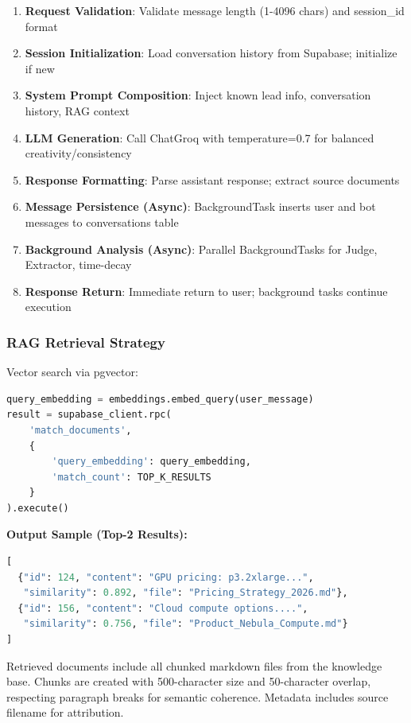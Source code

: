 \documentclass[10pt,twocolumn,a4paper]{article}
\begin{document}
\begin{enumerate}
    \item \textbf{Request Validation}: Validate message length (1-4096 chars) and session\_id format
    \item \textbf{Session Initialization}: Load conversation history from Supabase; initialize if new
    \item \textbf{System Prompt Composition}: Inject known lead info, conversation history, RAG context
    \item \textbf{LLM Generation}: Call ChatGroq with temperature=0.7 for balanced creativity/consistency
    \item \textbf{Response Formatting}: Parse assistant response; extract source documents
    \item \textbf{Message Persistence (Async)}: BackgroundTask inserts user and bot messages to conversations table
    \item \textbf{Background Analysis (Async)}: Parallel BackgroundTasks for Judge, Extractor, time-decay
    \item \textbf{Response Return}: Immediate return to user; background tasks continue execution
\end{enumerate}

\subsubsection{RAG Retrieval Strategy}

Vector search via pgvector:

\begin{lstlisting}[language=Python]
query_embedding = embeddings.embed_query(user_message)
result = supabase_client.rpc(
    'match_documents',
    {
        'query_embedding': query_embedding,
        'match_count': TOP_K_RESULTS
    }
).execute()
\end{lstlisting}

\textbf{Output Sample (Top-2 Results):}
\begin{lstlisting}[language=Python, basicstyle=\ttfamily\tiny]
[
  {"id": 124, "content": "GPU pricing: p3.2xlarge...", 
   "similarity": 0.892, "file": "Pricing_Strategy_2026.md"},
  {"id": 156, "content": "Cloud compute options....", 
   "similarity": 0.756, "file": "Product_Nebula_Compute.md"}
]
\end{lstlisting}

Retrieved documents include all chunked markdown files from the knowledge base. Chunks are created with 500-character size and 50-character overlap, respecting paragraph breaks for semantic coherence. Metadata includes source filename for attribution.
\end{document}
